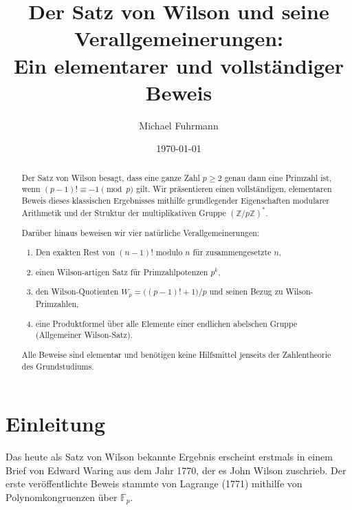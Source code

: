 \documentclass[12pt,a4paper]{amsart}
\theoremstyle{definition}
\newcommand{\Z}{\mathbb{Z}}
\newcommand{\Fp}{\mathbb{F}_p}
\begin{document}

\title{Der Satz von Wilson und seine Verallgemeinerungen:\\
       Ein elementarer und vollständiger Beweis}

\author{Michael Fuhrmann}
\address{Specialist-Mathematics-Projekt, Build 62}
\date{\today}

\begin{abstract}
Der Satz von Wilson besagt, dass eine ganze Zahl $p \geq 2$ genau dann eine
Primzahl ist, wenn $(p-1)! \equiv -1 \pmod{p}$ gilt.
Wir präsentieren einen vollständigen, elementaren Beweis dieses klassischen
Ergebnisses mithilfe grundlegender Eigenschaften modularer Arithmetik und
der Struktur der multiplikativen Gruppe $(\Z/p\Z)^*$.

Darüber hinaus beweisen wir vier natürliche Verallgemeinerungen:
\begin{enumerate}
  \item[(i)]   Den exakten Rest von $(n-1)!$ modulo $n$ für zusammengesetzte $n$,
  \item[(ii)]  einen Wilson-artigen Satz für Primzahlpotenzen $p^k$,
  \item[(iii)] den Wilson-Quotienten $W_p = \bigl((p-1)!+1\bigr)/p$
               und seinen Bezug zu Wilson-Primzahlen,
  \item[(iv)]  eine Produktformel über alle Elemente einer endlichen abelschen
               Gruppe (Allgemeiner Wilson-Satz).
\end{enumerate}
Alle Beweise sind elementar und benötigen keine Hilfsmittel jenseits der
Zahlentheorie des Grundstudiums.
\end{abstract}

\maketitle
\tableofcontents

\section{Einleitung}

Das heute als Satz von Wilson bekannte Ergebnis erscheint erstmals in einem
Brief von Edward Waring aus dem Jahr 1770, der es John Wilson zuschrieb.
Der erste veröffentlichte Beweis stammte von Lagrange (1771) mithilfe
von Polynomkongruenzen über $\Fp$.
\end{document}
